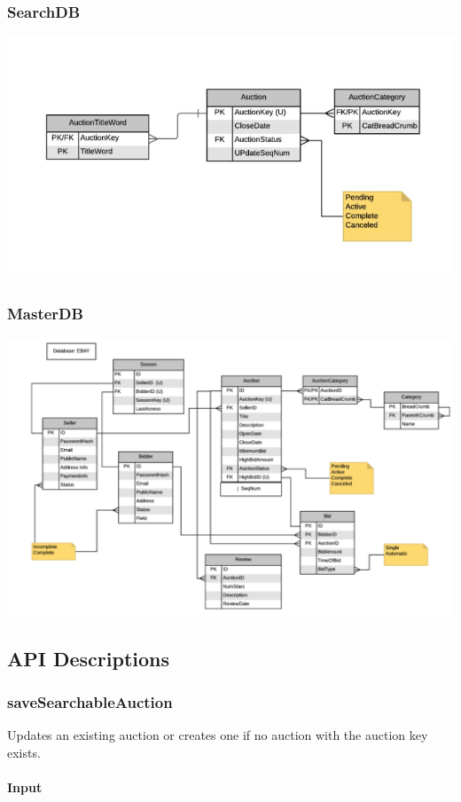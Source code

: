 \documentclass[12pt,a4paper]{article}
\begin{document}
\subsubsection{SearchDB}
\includegraphics[scale=0.5]{images/search-schema.png}
\subsubsection{MasterDB}
\includegraphics[scale=0.35]{images/master-schema.png}
\pagebreak
\subsection{API Descriptions}

\subsubsection{saveSearchableAuction}
\label{ref:csa}
Updates an existing auction or creates one if no auction with the auction key
exists.

\paragraph{Input}
\end{document}

